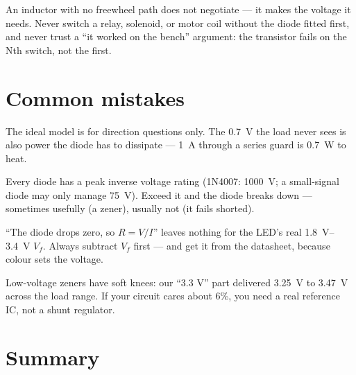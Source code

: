\begin{rulebox}
An inductor with no freewheel path does not negotiate --- it makes the
voltage it needs. Never switch a relay, solenoid, or motor coil without
the diode fitted first, and never trust a ``it worked on the bench''
argument: the transistor fails on the Nth switch, not the first.
\end{rulebox}

\section{Common mistakes}\label{sec:diode-mistakes}

\begin{tripwire}
The ideal model is for direction questions only. The \qty{0.7}{\volt}
the load never sees is also power the diode has to dissipate ---
\qty{1}{\ampere} through a series guard is \qty{0.7}{\watt} to heat.
\end{tripwire}

\begin{tripwire}
Every diode has a peak inverse voltage rating (1N4007: \qty{1000}{\volt};
a small-signal diode may only manage \qty{75}{\volt}). Exceed it and the
diode breaks down --- sometimes usefully (a zener), usually not (it
fails shorted).
\end{tripwire}

\begin{tripwire}
``The diode drops zero, so $R=V/I$'' leaves nothing for the LED's real
\qty{1.8}{\volt}--\qty{3.4}{\volt} $V_f$. Always subtract $V_f$ first ---
and get it from the datasheet, because colour sets the voltage.
\end{tripwire}

\begin{tripwire}
Low-voltage zeners have soft knees: our ``3.3 V'' part delivered
\qty{3.25}{\volt} to \qty{3.47}{\volt} across the load range. If your
circuit cares about 6\%, you need a real reference IC, not a shunt
regulator.
\end{tripwire}

\section{Summary}\label{sec:diode-summary}

